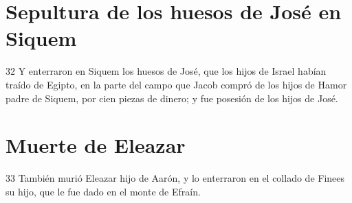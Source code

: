 \section*{Sepultura de los huesos de José en Siquem}

32 Y enterraron en Siquem los huesos de José, que los hijos de Israel habían traído de Egipto, en la parte del campo que Jacob compró de los hijos de Hamor padre de Siquem, por cien piezas de dinero; y fue posesión de los hijos de José.

\section*{Muerte de Eleazar}

33 También murió Eleazar hijo de Aarón, y lo enterraron en el collado de Finees su hijo, que le fue dado en el monte de Efraín.

